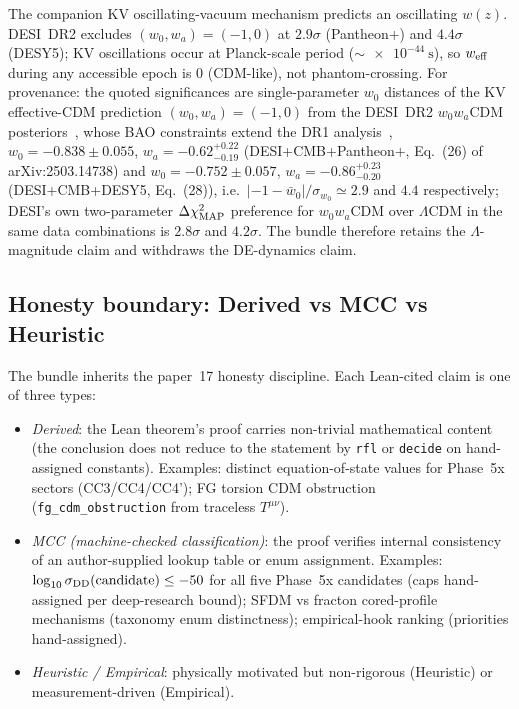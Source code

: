 \documentclass[aps,prd,reprint,nofootinbib,superscriptaddress]{revtex4-2}
\begin{document}
The companion KV oscillating-vacuum mechanism predicts an oscillating
$w(z)$. DESI~DR2 excludes $(w_0, w_a) = (-1, 0)$ at $2.9\sigma$
(Pantheon+) and $4.4\sigma$ (DESY5); KV oscillations occur at
Planck-scale period (${\sim}\SI{e-44}{\second}$), so $w_{\rm eff}$
during any accessible epoch is $0$ (CDM-like), not phantom-crossing.
For provenance: the quoted significances are single-parameter $w_0$
distances of the KV effective-CDM prediction $(w_0, w_a) = (-1, 0)$
from the DESI~DR2 $w_0 w_a$CDM posteriors~\cite{DESI2025}, whose BAO
constraints extend the DR1 analysis~\cite{DESI2024},
$w_0 = -0.838 \pm 0.055$, $w_a = -0.62^{+0.22}_{-0.19}$
(DESI+CMB+Pantheon$+$, Eq.~(26) of arXiv:2503.14738) and
$w_0 = -0.752 \pm 0.057$, $w_a = -0.86^{+0.23}_{-0.20}$
(DESI+CMB+DESY5, Eq.~(28)), i.e.\
$|{-1} - \bar{w}_0| / \sigma_{w_0} \simeq 2.9$ and $4.4$ respectively;
DESI's own two-parameter $\Delta\chi^2_{\rm MAP}$ preference for
$w_0 w_a$CDM over $\Lambda$CDM in the same data combinations is
$2.8\sigma$ and $4.2\sigma$.
The bundle therefore retains the $\Lambda$-magnitude claim and
withdraws the DE-dynamics claim.

\subsection{Honesty boundary: Derived vs MCC vs Heuristic}
\label{subsec:honesty}

The bundle inherits the paper~17 honesty discipline. Each Lean-cited
claim is one of three types:

\begin{itemize}
\item \emph{Derived}: the Lean theorem's proof carries non-trivial
  mathematical content (the conclusion does not reduce to the statement
  by \texttt{rfl} or \texttt{decide} on hand-assigned constants).
  Examples: distinct equation-of-state values for Phase~5x sectors
  (CC3/CC4/CC4'); FG torsion CDM obstruction (\texttt{fg\_cdm\_obstruction}
  from traceless $T^{\mu\nu}$).
\item \emph{MCC (machine-checked classification)}: the proof verifies
  internal consistency of an author-supplied lookup table or enum
  assignment. Examples: $\log_{10}\sigma_{\rm DD}(\text{candidate})
  \leq -50$ for all five Phase~5x candidates (caps hand-assigned per
  deep-research bound); SFDM vs fracton cored-profile mechanisms
  (taxonomy enum distinctness); empirical-hook ranking (priorities
  hand-assigned).
\item \emph{Heuristic / Empirical}: physically motivated but
  non-rigorous (Heuristic) or measurement-driven (Empirical).
\end{itemize}
\end{document}
